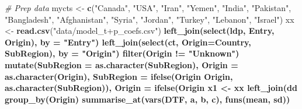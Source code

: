 \documentclass[
]{article}
\newenvironment{Shaded}{\begin{snugshade}}{\end{snugshade}}
\newcommand{\CommentTok}[1]{\textcolor[rgb]{0.56,0.35,0.01}{\textit{#1}}}
\newcommand{\DataTypeTok}[1]{\textcolor[rgb]{0.13,0.29,0.53}{#1}}
\newcommand{\KeywordTok}[1]{\textcolor[rgb]{0.13,0.29,0.53}{\textbf{#1}}}
\newcommand{\NormalTok}[1]{#1}
\newcommand{\OperatorTok}[1]{\textcolor[rgb]{0.81,0.36,0.00}{\textbf{#1}}}
\newcommand{\StringTok}[1]{\textcolor[rgb]{0.31,0.60,0.02}{#1}}
\begin{document}
\begin{Shaded}
\begin{Highlighting}[]
\CommentTok{# Prep data}
\NormalTok{mycts <-}\StringTok{ }\KeywordTok{c}\NormalTok{(}\StringTok{"Canada"}\NormalTok{, }\StringTok{"USA"}\NormalTok{, }\StringTok{"Iran"}\NormalTok{, }\StringTok{"Yemen"}\NormalTok{,}
           \StringTok{"India"}\NormalTok{, }\StringTok{"Pakistan"}\NormalTok{, }\StringTok{"Bangladesh"}\NormalTok{, }\StringTok{"Afghanistan"}\NormalTok{,}
           \StringTok{"Syria"}\NormalTok{, }\StringTok{"Jordan"}\NormalTok{, }\StringTok{"Turkey"}\NormalTok{, }\StringTok{"Lebanon"}\NormalTok{, }\StringTok{"Israel"}\NormalTok{)}
\NormalTok{xx <-}\StringTok{ }\KeywordTok{read.csv}\NormalTok{(}\StringTok{"data/model_t+p_coefs.csv"}\NormalTok{) }\OperatorTok{%
\StringTok{  }\KeywordTok{left_join}\NormalTok{(}\KeywordTok{select}\NormalTok{(ldp, Entry, Origin), }\DataTypeTok{by =} \StringTok{"Entry"}\NormalTok{) }\OperatorTok{%
\StringTok{  }\KeywordTok{left_join}\NormalTok{(}\KeywordTok{select}\NormalTok{(ct, }\DataTypeTok{Origin=}\NormalTok{Country, SubRegion), }\DataTypeTok{by =} \StringTok{"Origin"}\NormalTok{) }\OperatorTok{%
\StringTok{  }\KeywordTok{filter}\NormalTok{(Origin }\OperatorTok{!=}\StringTok{ "Unknown"}\NormalTok{) }\OperatorTok{%
\StringTok{  }\KeywordTok{mutate}\NormalTok{(}\DataTypeTok{SubRegion =} \KeywordTok{as.character}\NormalTok{(SubRegion), }\DataTypeTok{Origin =} \KeywordTok{as.character}\NormalTok{(Origin),}
         \DataTypeTok{SubRegion =} \KeywordTok{ifelse}\NormalTok{(Origin }\OperatorTok{%
\NormalTok{                            Origin, }\KeywordTok{as.character}\NormalTok{(SubRegion)),}
         \DataTypeTok{Origin =} \KeywordTok{ifelse}\NormalTok{(Origin }\OperatorTok{%
\NormalTok{x1 <-}\StringTok{ }\NormalTok{xx }\OperatorTok{%
\StringTok{  }\KeywordTok{left_join}\NormalTok{(dd }\OperatorTok{%
\StringTok{  }\KeywordTok{group_by}\NormalTok{(Origin) }\OperatorTok{%
\StringTok{  }\KeywordTok{summarise_at}\NormalTok{(}\KeywordTok{vars}\NormalTok{(DTF, a, b, c), }\KeywordTok{funs}\NormalTok{(mean, sd)) }\OperatorTok{%
}}}}}}}}}}
\end{Highlighting}
\end{Shaded}
\end{document}
